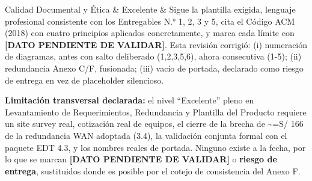 \documentclass[11pt,a4paper]{article}
\begin{document}
{\begin{longtable}[]
Calidad Documental y Ética & Excelente & Sigue la plantilla exigida, lenguaje profesional consistente con los Entregables N.° 1, 2, 3 y 5, cita el Código ACM (2018) con cuatro principios aplicados concretamente, y marca cada límite con \textbf{{[}DATO PENDIENTE DE VALIDAR{]}}. Esta revisión corrigió: (i) numeración de diagramas, antes con salto deliberado (1,2,3,5,6), ahora consecutiva (1-5); (ii) redundancia Anexo C/F, fusionada; (iii) vacío de portada, declarado como riesgo de entrega en vez de placeholder silencioso. \\
\end{longtable}
}

\textbf{Limitación transversal declarada:} el nivel ``Excelente'' pleno en Levantamiento de Requerimientos, Redundancia y Plantilla del Producto requiere un site survey real, cotización real de equipos, el cierre de la brecha de \textasciitilde=S/ 166 de la redundancia WAN adoptada (3.4), la validación conjunta formal con el paquete EDT 4.3, y los nombres reales de portada. Ninguno existe a la fecha, por lo que se marcan \textbf{{[}DATO PENDIENTE DE VALIDAR{]}} o \textbf{riesgo de entrega}, sustituidos donde es posible por el cotejo de consistencia del Anexo F.
\end{document}

